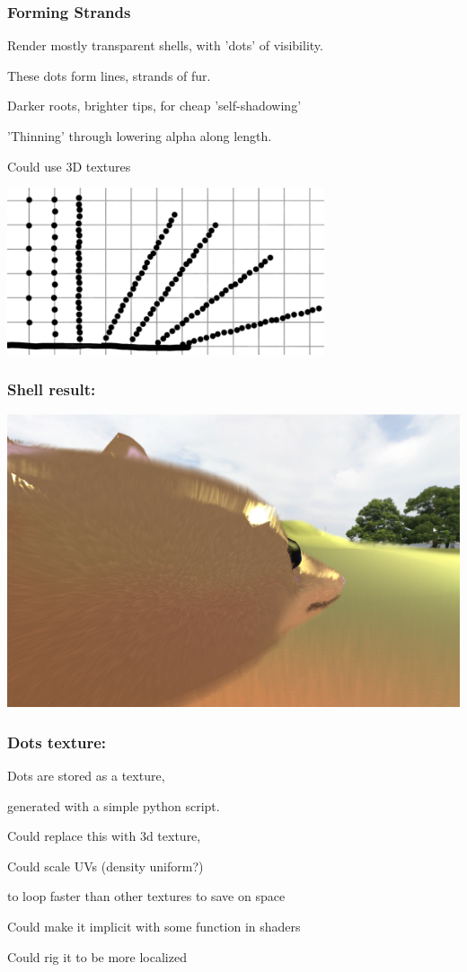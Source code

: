 \documentclass[12pt]{beamer}
\begin{document}
    \begin{frame}
        \frametitle{ Forming Strands }
        Render mostly transparent shells, with 'dots' of visibility.

        These dots form lines, strands of fur.

        Darker roots, brighter tips, for cheap 'self-shadowing'

        'Thinning' through lowering alpha along length.

        Could use 3D textures
        \vspace{0.5em}

        \includegraphics[width=0.7\textwidth]{dotsformlines}
    \end{frame}

    \begin{frame}
        \frametitle{ Shell result: }

        \includegraphics[width=\textwidth]{shells}
    \end{frame}

    \begin{frame}
        \frametitle{ Dots texture: }

        Dots are stored as a texture,

        generated with a simple python script.

        Could replace this with 3d texture,

        Could scale UVs (density uniform?)

        to loop faster than other textures to save on space

        Could make it implicit with some function in shaders

        Could rig it to be more localized
    \end{frame}
\end{document}

